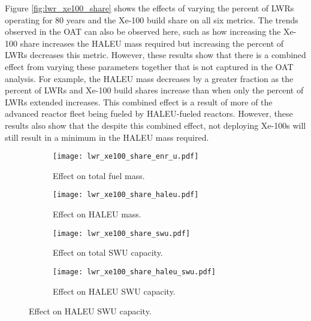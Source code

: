 Figure \ref{fig:lwr_xe100_share} shows the effects of varying the 
percent of \glspl{LWR} operating for 80 years and the Xe-100 
build share on all six metrics. The trends observed in the \gls{OAT} 
can also be observed here, such as how increasing the Xe-100 share 
increases the \gls{HALEU} mass required but increasing the 
percent of \glspl{LWR} decreases this metric. However, these results 
show that there is a combined effect from varying these parameters 
together that is not captured in the \gls{OAT} analysis. For 
example, the \gls{HALEU} mass decreases by a greater fraction 
as the percent of \glspl{LWR} and Xe-100 build shares increase than 
when only the percent of \glspl{LWR} extended increases. This combined 
effect is a result of more of the advanced reactor fleet being fueled 
by \gls{HALEU}-fueled reactors. However, these results also show that 
the despite this combined effect, not deploying Xe-100s will still
result in a minimum in the \gls{HALEU} mass required. 

\begin{figure}
    \begin{subfigure}[t]{0.48\textwidth}
        \centering
        \texttt{[image: lwr\_xe100\_share\_enr\_u.pdf]}
        \caption{Effect on total fuel mass.}
        \label{fig:lwr_xe100_share_enr_u}
    \end{subfigure}
    \hfill
    \begin{subfigure}[t]{0.48\textwidth}
        \centering
        \texttt{[image: lwr\_xe100\_share\_haleu.pdf]}
        \caption{Effect on HALEU mass.}
        \label{fig:lwr_xe100_share_haleu}
    \end{subfigure}  
    \begin{subfigure}[t]{0.48\textwidth}
        \centering
        \texttt{[image: lwr\_xe100\_share\_swu.pdf]}
        \caption{Effect on total SWU capacity.}
        \label{fig:lwr_xe100_share_swu}
    \end{subfigure}
    \hfill
    \begin{subfigure}[t]{0.48\textwidth}
        \centering
        \texttt{[image: lwr\_xe100\_share\_haleu\_swu.pdf]}
        \caption{Effect on HALEU SWU capacity.}
        \label{fig:lwr_xe100_share_haleu_swu}
    \end{subfigure}
\end{figure}

